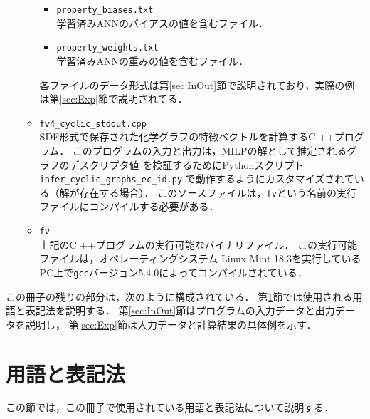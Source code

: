 \documentclass[11pt, titlepage, dvipdfmx, twoside]{jarticle}
\begin{document}
\begin{itemize}
\begin{itemize}
\begin{itemize}
\item {\tt property\_biases.txt}\\
学習済みANNのバイアスの値を含むファイル．

\item {\tt property\_weights.txt}\\
学習済みANNの重みの値を含むファイル．
\end{itemize}
%
各ファイルのデータ形式は第\ref{sec:InOut}節で説明されており，実際の例は第\ref{sec:Exp}節で説明されてる．

\item {\tt fv4\_cyclic\_stdout.cpp}\\
SDF形式で保存された化学グラフの特徴ベクトルを計算するC ++プログラム．
このプログラムの入力と出力は，MILPの解として推定されるグラフのデスクリプタ値
を検証するためにPythonスクリプト{\tt infer\_cyclic\_graphs\_ec\_id.py}
で動作するようにカスタマイズされている（解が存在する場合）．
このソースファイルは，{\tt fv}という名前の実行ファイルにコンパイルする必要がある．

\item {\tt fv}\\
上記のC ++プログラムの実行可能なバイナリファイル．
この実行可能ファイルは，オペレーティングシステム
Linux Mint 18.3を実行しているPC上で{\tt gcc}バージョン5.4.0によってコンパイルされている．
%
\end{itemize}
\end{itemize}



この冊子の残りの部分は，次のように構成されている．
第\ref{sec:Pre}節では使用される用語と表記法を説明する．
%
第\ref{sec:InOut}節はプログラムの入力データと出力データを説明し，
第\ref{sec:Exp}節は入力データと計算結果の具体例を示す．


\section{用語と表記法}
\label{sec:Pre}
%
この節では，この冊子で使用されている用語と表記法について説明する．
\end{document}
